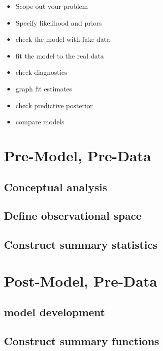 \documentclass[11pt, oneside]{book}
\providecommand{\tightlist}{%
  \setlength{\itemsep}{0pt}\setlength{\parskip}{0pt}}
\begin{document}
\begin{itemize}
\tightlist
\item
  Scope out your problem
\item
  Specify likelihood and priors
\item
  check the model with fake data
\item
  fit the model to the real data
\item
  check diagnostics
\item
  graph fit estimates
\item
  check predictive posterior
\item
  compare models
\end{itemize}

\hypertarget{pre-model-pre-data}{%
\section{Pre-Model, Pre-Data}\label{pre-model-pre-data}}

\hypertarget{conceptual-analysis}{%
\subsection{Conceptual analysis}\label{conceptual-analysis}}

\hypertarget{define-observational-space}{%
\subsection{Define observational space}\label{define-observational-space}}

\hypertarget{construct-summary-statistics}{%
\subsection{Construct summary statistics}\label{construct-summary-statistics}}

\hypertarget{post-model-pre-data}{%
\section{Post-Model, Pre-Data}\label{post-model-pre-data}}

\hypertarget{model-development}{%
\subsection{model development}\label{model-development}}

\hypertarget{construct-summary-functions}{%
\subsection{Construct summary functions}\label{construct-summary-functions}}
\end{document}

